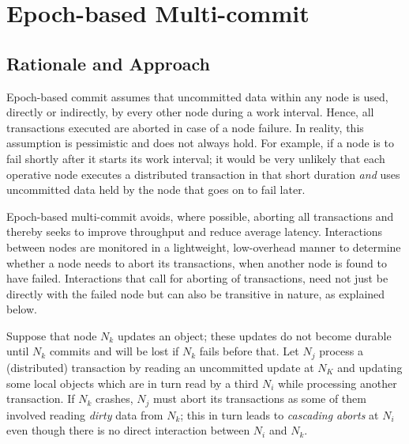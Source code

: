 \section{Epoch-based Multi-commit}
\label{sec:epoch-based-multi}


\subsection{Rationale and Approach}
\label{sec:ebmc-motivation}



Epoch-based commit assumes that uncommitted data within any node is used, directly or indirectly, by every 
other node during a work interval. Hence, all transactions executed are aborted in case of a node failure.
In reality, this assumption is pessimistic and does not always hold. For example, if a node is to fail 
shortly after it starts its work interval; it would be very unlikely that each operative node executes a 
distributed transaction in that short duration
\emph{and} uses uncommitted data held by the node that goes on to fail later.

Epoch-based multi-commit avoids, where possible, aborting all transactions and thereby seeks to improve 
throughput and reduce average latency. Interactions between nodes are monitored in a lightweight, 
low-overhead manner
to determine whether a node needs to abort its transactions, when another node is found to have failed.
Interactions that call for aborting of transactions,  need not just be directly with the failed node but can also be transitive in nature, as explained 
below.



Suppose that node $N_k$ updates an object; these updates do not become durable until $N_k$ commits and will 
be lost if $N_k$ fails before that. Let $N_j$ process a (distributed) transaction by reading an uncommitted 
update at $N_K$ and updating some local objects which are in turn read by a third $N_i$ while processing 
another transaction. If $N_k$ crashes, $N_j$ must abort its transactions as some of them involved reading 
\emph{dirty} data from $N_k$; this in turn leads to \emph{cascading aborts} at $N_i$ even though there is no 
direct interaction between $N_i$ and $N_k$.

